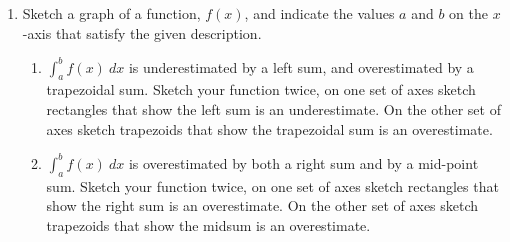 \documentclass[12pt]{article}
\begin{document}
\begin{enumerate}
%
%
%
%
\item Sketch a graph of a function, $f(x)$, and indicate the values $a$ and $b$ on the $x$-axis that satisfy the given description.
\begin{enumerate}
\item $\displaystyle \int_a^b f(x) \ dx$ is underestimated by a left sum, and overestimated by a trapezoidal sum. Sketch your function twice, on one set of axes sketch rectangles that show the left sum is an underestimate. On the other set of axes sketch trapezoids that show the trapezoidal sum is an overestimate.\vspace{6cm}
\item $\displaystyle \int_a^b f(x) \ dx$ is overestimated by both a right sum and by a mid-point sum. Sketch your function twice, on one set of axes sketch rectangles that show the right sum is an overestimate. On the other set of axes sketch trapezoids that show the midsum is an overestimate.
\end{enumerate}
\end{enumerate}
\end{document}
